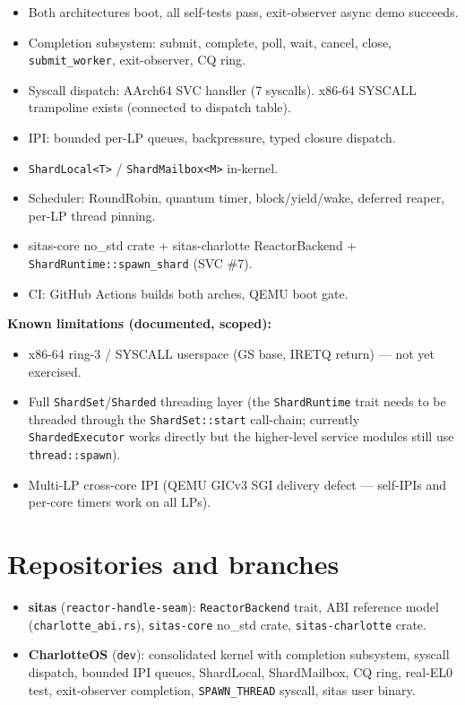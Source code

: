 \begin{itemize}
    \item Both architectures boot, all self-tests pass, exit-observer
        async demo succeeds.
    \item Completion subsystem: submit, complete, poll, wait, cancel, close,
        \texttt{submit\_worker}, exit-observer, CQ ring.
    \item Syscall dispatch: AArch64 SVC handler (7 syscalls). x86-64 SYSCALL
        trampoline exists (connected to dispatch table).
    \item IPI: bounded per-LP queues, backpressure, typed closure dispatch.
    \item \texttt{ShardLocal<T>} / \texttt{ShardMailbox<M>} in-kernel.
    \item Scheduler: RoundRobin, quantum timer, block/yield/wake, deferred
        reaper, per-LP thread pinning.
    \item sitas-core no\_std crate + sitas-charlotte ReactorBackend +
        \texttt{ShardRuntime::spawn\_shard} (SVC \#7).
    \item CI: GitHub Actions builds both arches, QEMU boot gate.
\end{itemize}

\textbf{Known limitations (documented, scoped):}

\begin{itemize}
    \item x86-64 ring-3 / SYSCALL userspace (GS base, IRETQ return) --- not
        yet exercised.
    \item Full \texttt{ShardSet}/\texttt{Sharded} threading layer (the
        \texttt{ShardRuntime} trait needs to be threaded through the
        \texttt{ShardSet::start} call-chain; currently \texttt{ShardedExecutor}
        works directly but the higher-level service modules still use
        \texttt{thread::spawn}).
    \item Multi-LP cross-core IPI (QEMU GICv3 SGI delivery defect --- self-IPIs
        and per-core timers work on all LPs).
\end{itemize}

\section{Repositories and branches}

\begin{itemize}
    \item \textbf{sitas} (\texttt{reactor-handle-seam}):
        \texttt{ReactorBackend} trait, ABI reference model
        (\texttt{charlotte\_abi.rs}), \texttt{sitas-core} no\_std crate,
        \texttt{sitas-charlotte} crate.
    \item \textbf{CharlotteOS} (\texttt{dev}): consolidated kernel with
        completion subsystem, syscall dispatch, bounded IPI queues,
        ShardLocal, ShardMailbox, CQ ring, real-EL0 test, exit-observer
        completion, \texttt{SPAWN\_THREAD} syscall, sitas user binary.
\end{itemize}

\endinput
